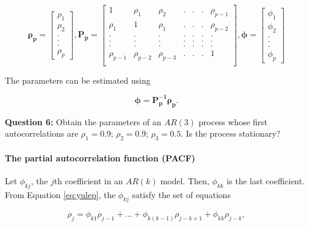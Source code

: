 \documentclass[]{book}
\let\oldparagraph\paragraph
\renewcommand{\paragraph}[1]{\oldparagraph{#1}\mbox{}}
\begin{document}
\[\symbf{\rho_p} = \left[\begin{array}
{r}
\rho_1  \\
\rho_2  \\
.\\
.\\
.\\
\rho_p
\end{array}\right], \mathbf{P_p} = \left[\begin{array}
{rrrrrrr}
1 & \rho_1 & \rho_2 & .&.&.& \rho_{p-1} \\
\rho_1 & 1 & \rho_1 & .&.&.& \rho_{p-2} \\
. & . & . & .&.&.& . \\
. & . & . & .&.&.& . \\
. & . & . & .&.&.& . \\
\rho_{p-1} & \rho_{p-2} & \rho_{p-3} & .&.&.& 1 \\
\end{array}\right], \symbf{{\phi}} = \left[\begin{array}
{r}
\phi_1  \\
\phi_2  \\
.\\
.\\
.\\
\phi_p
\end{array}\right]\]

The parameters can be estimated using

\[\symbf{\phi}=\symbf{P_p^{-1}\rho_p}.\]

\textbf{Question 6:} Obtain the parameters of an \(AR(3)\) process whose first autocorrelations are \(\rho_1=0.9\); \(\rho_2=0.9\); \(\rho_3=0.5\). Is the process stationary?

\hypertarget{the-partial-autocorrelation-function-pacf}{%
\paragraph{The partial autocorrelation function (PACF)}\label{the-partial-autocorrelation-function-pacf}}

Let \(\phi_{kj}\), the \(j\)th coefficient in an \(AR(k)\) model. Then, \(\phi_{kk}\) is the last coefficient. From Equation \eqref{eq:yulep}, the \(\phi_{kj}\) satisfy the set of equations

\begin{equation}
\label{eq:pacf}
\rho_j=\phi_{k1}\rho_{j-1}+...+\phi_{k(k-1)}\rho_{j-k+1}+\phi_{kk}\rho_{j-k},
\end{equation}
\end{document}
